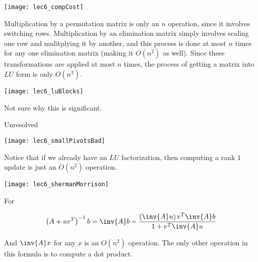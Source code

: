 \documentclass[../main.tex]{subfiles}
\begin{document}
\begin{remark}
\begin{center}
    \texttt{[image: lec6\_compCost]}
\end{center}

Multiplication by a permutation matrix is only an $n$ operation, since it involves switching rows. Multiplication by an elimination matrix simply involves scaling one row and mulitplying it by another, and this process is done at most $n$ times for any one elimination matrix (making it $O(n^2)$ as well). Since these transformations are applied at most $n$ times, the process of getting a matrix into $LU$ form is only $O(n^3)$.
\end{remark}

\begin{remark}

\begin{center}
    \texttt{[image: lec6\_luBlocks]}
\end{center}

Not sure why this is significant.

\end{remark}


\begin{remark}
    Unresolved
\begin{center}
    \texttt{[image: lec6\_smallPivotsBad]}
\end{center}
\end{remark}

\begin{remark}
    Notice that if we already have an $LU$ factorization, then computing a rank $1$ update is just an $O(n^2)$ operation.
\begin{center}
    \texttt{[image: lec6\_shermanMorrison]}
\end{center}

For 

\[
    \left( A + uv^T \right)^{-1}b = \inv{A}b - \frac{\left( \inv{A}u \right)v^T\inv{A}b}{1 + v^T\inv{A}u}
\]

And $\inv{A}x$ for any $x$ is an $O(n^2)$ operation. The only other operation in this formula is to compute a dot product.
\end{remark}
\end{document}
